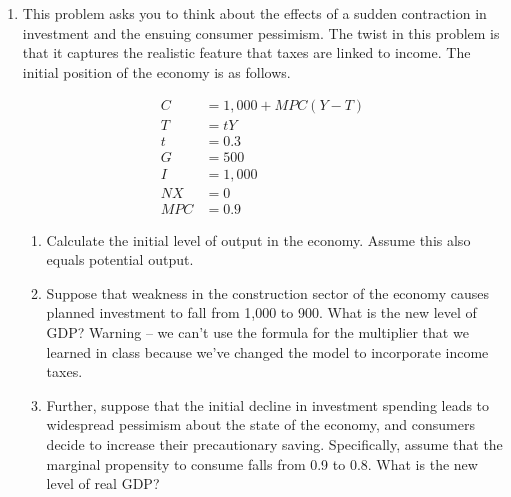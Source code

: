 \documentclass{article}
\begin{document}
\begin{enumerate}
Suppose that the real interest rate, $r$, is initially equal to 5\%, or 0.05.

	\begin{enumerate}
	
	\item Calculate the short-run equilibrium level of real GDP. Is the economy in an expansion or a recession?
	
	\item Suppose that the Fed and the government would like to move the economy back to potential output. The government is only willing to step in with changes in taxes if the Fed is unable to close the gap between potential and actual output. The government is not willing to change spending. Calculate the interest rate and the level of taxes after the necessary actions are taken by the Fed and the government.
	
	\end{enumerate}
	
\item This problem asks you to think about the effects of a sudden contraction in investment and the ensuing consumer pessimism. The twist in this problem is that it captures the realistic feature that taxes are linked to income. The initial position of the economy is as follows.

	\begin{align*}
	C &= 1,000 + MPC(Y - T) \\
	T &= tY \\
	t &= 0.3 \\
	G &= 500 \\
	I &= 1,000 \\
	NX &= 0 \\
	MPC &= 0.9
	\end{align*}

	\begin{enumerate}
	
	\item Calculate the initial level of output in the economy. Assume this also equals potential output.
	
	\item Suppose that weakness in the construction sector of the economy causes planned investment to fall from 1,000 to 900. What is the new level of GDP? Warning -- we can't use the formula for the multiplier that we learned in class because we've changed the model to incorporate income taxes.
	
	\item Further, suppose that the initial decline in investment spending leads to widespread pessimism about the state of the economy, and consumers decide to increase their precautionary saving. Specifically, assume that the marginal propensity to consume falls from 0.9 to 0.8. What is the new level of real GDP?
	

\end{enumerate}
\end{enumerate}
\end{document}
